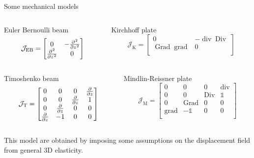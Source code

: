 \documentclass[aspectratio=169]{ISAE-Beamer}
\DeclareMathOperator*{\grad}{grad}
\DeclareMathOperator*{\Grad}{Grad}
\DeclareMathOperator*{\Div}{Div}
\renewcommand{\div}{\operatorname{div}}
\begin{document}
\begin{frame}{Some mechanical models}
\begin{columns}
	\begin{column}{.5\textwidth}
	Euler Bernoulli beam
	\begin{equation*}
	\mathcal{J}_{\text{EB}} = 
	\begin{bmatrix}
	0 & -\diffp[2]{}{z} \\
	\diffp[2]{}{z} & 0 \\
	\end{bmatrix}
	\end{equation*}
	\end{column}
	\begin{column}{.5\textwidth}
	Kirchhoff plate
	\begin{equation*}
	\mathcal{J}_{\text{K}} = 
	\begin{bmatrix}
	0 & -\div\Div \\ \Grad\grad & 0 \\
	\end{bmatrix}
	\end{equation*}
	\end{column}
\end{columns}
\vspace{1cm}
\begin{columns}
	\begin{column}{.5\textwidth}
	Timoshenko beam
	\begin{equation*}
	\mathcal{J}_{\text{T}} = 
	\begin{bmatrix}
	0 &  0 & 0 & \diffp{}{z} \\
	0 & 0 & \diffp{}{z} & 1  \\
	0 & \diffp{}{z} & 0 & 0  \\
	\diffp{}{z} & -1 & 0 & 0 \\
	\end{bmatrix}
	\end{equation*}
	\end{column}
	\begin{column}{.5\textwidth}
	Mindlin-Reissner plate
	\begin{equation*}
	\mathcal{J}_{\text{M}} = 
	\begin{bmatrix}
	0 &  0 & 0 & \div \\
	0 & 0 & \Div & \mathds{1} \\
	0 & \Grad & 0 & 0  \\
	\grad & -\mathds{1} & 0 & 0 \\
	\end{bmatrix}
	\end{equation*}
	\end{column}
\end{columns}
\vspace{1cm}
This model are obtained by imposing some assumptions on the displacement field from general 3D elasticity.
\end{frame}
\end{document}
